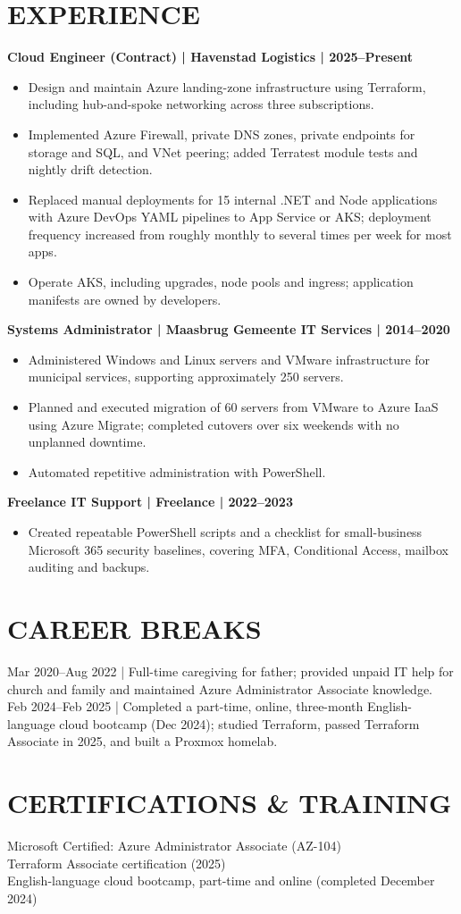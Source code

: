 \documentclass[11pt,a4paper]{article}
\begin{document}
\section*{EXPERIENCE}
\textbf{Cloud Engineer (Contract) | Havenstad Logistics | 2025–Present}
\begin{itemize}
\item Design and maintain Azure landing-zone infrastructure using Terraform, including hub-and-spoke networking across three subscriptions.
\item Implemented Azure Firewall, private DNS zones, private endpoints for storage and SQL, and VNet peering; added Terratest module tests and nightly drift detection.
\item Replaced manual deployments for 15 internal .NET and Node applications with Azure DevOps YAML pipelines to App Service or AKS; deployment frequency increased from roughly monthly to several times per week for most apps.
\item Operate AKS, including upgrades, node pools and ingress; application manifests are owned by developers.
\end{itemize}

\textbf{Systems Administrator | Maasbrug Gemeente IT Services | 2014–2020}
\begin{itemize}
\item Administered Windows and Linux servers and VMware infrastructure for municipal services, supporting approximately 250 servers.
\item Planned and executed migration of 60 servers from VMware to Azure IaaS using Azure Migrate; completed cutovers over six weekends with no unplanned downtime.
\item Automated repetitive administration with PowerShell.
\end{itemize}

\textbf{Freelance IT Support | Freelance | 2022–2023}
\begin{itemize}
\item Created repeatable PowerShell scripts and a checklist for small-business Microsoft 365 security baselines, covering MFA, Conditional Access, mailbox auditing and backups.
\end{itemize}

\section*{CAREER BREAKS}
Mar 2020–Aug 2022 | Full-time caregiving for father; provided unpaid IT help for church and family and maintained Azure Administrator Associate knowledge.\\
Feb 2024–Feb 2025 | Completed a part-time, online, three-month English-language cloud bootcamp (Dec 2024); studied Terraform, passed Terraform Associate in 2025, and built a Proxmox homelab.

\section*{CERTIFICATIONS \& TRAINING}
Microsoft Certified: Azure Administrator Associate (AZ-104)\\
Terraform Associate certification (2025)\\
English-language cloud bootcamp, part-time and online (completed December 2024)
\end{document}
